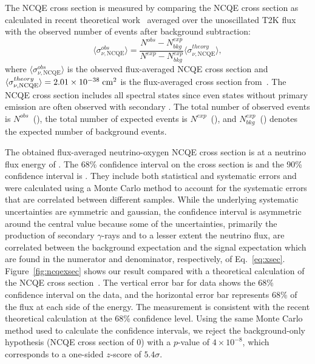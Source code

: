 \documentclass[
aps,
prd,
twocolumn,
superscriptaddress,
showpacs
]{revtex4-1}
\begin{document}
The NCQE cross section is measured by comparing the NCQE cross section as calculated in recent theoretical work~\cite{Ankowski:2011ei} averaged over the unoscillated T2K flux with the observed number of events after background subtraction:
\begin{equation}\label{eq:xsec}
\langle \sigma_{\nu, \mathrm{NCQE}}^{obs} \rangle = \frac{N^{obs}-N_{bkg}^{exp}}{N^{exp}-N_{bkg}^{exp}}\langle \sigma_{\nu, \mathrm{NCQE}}^{theory} \rangle,
\end{equation}
where $\langle \sigma_{\nu, \mathrm{NCQE}}^{obs} \rangle$ is the observed flux-averaged NCQE cross section and $\langle \sigma_{\nu, \mathrm{NCQE}}^{theory} \rangle = 2.01 \times 10^{-38} \; \mathrm{cm^2}$ is the flux-averaged cross section from~\cite{Ankowski:2011ei}.  The NCQE cross section includes all spectral states since even states without primary \gmr emission are often observed with secondary \gmrs. The total number of observed events is $N^{obs}$~(\obs), the total number of expected events is $N^{exp}$~(\mctot), and $N_{bkg}^{exp}$~(\bkgd) denotes the expected number of background events. 

The obtained flux-averaged neutrino-oxygen NCQE cross section is  at a \fluxtype neutrino flux energy of \fluxmean. The 68\% confidence interval on the cross section is  and the 90\% confidence interval is . They include both statistical and systematic errors and were calculated using a Monte Carlo method to account for the systematic errors that are correlated between different samples.  
While the underlying systematic uncertainties are symmetric and gaussian, the confidence interval is asymmetric around the central value because some of the uncertainties, primarily the production of secondary $\gamma$-rays and to a lesser extent the neutrino flux, are correlated between the background expectation and the signal expectation which are found in the numerator and denominator, respectively, of Eq.~\ref{eq:xsec}. Figure~\ref{fig:ncqexsec} shows our result compared with a theoretical calculation of the NCQE cross section~\cite{Ankowski:2011ei}. The vertical error bar for data shows the 68\% confidence interval on the data, and the horizontal error bar represents 68\% of the flux at each side of the \fluxtype energy. The measurement is consistent with the recent theoretical calculation at the 68\% confidence level.  Using the same Monte Carlo method used to calculate the confidence intervals, we reject the background-only hypothesis (NCQE cross section of 0) with a $p$-value of $4 \times 10^{-8}$, which corresponds to a one-sided $z$-score of $5.4\sigma$.
\end{document}
